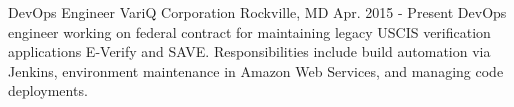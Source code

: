 

\begin{cventries}

  \cventrysix
    {DevOps Engineer} %
    {VariQ Corporation} %
    {Rockville, MD} %
    {Apr. 2015 - Present} %
    {DevOps engineer working on federal contract for maintaining legacy USCIS verification applications E-Verify and SAVE. Responsibilities include build automation via Jenkins, environment maintenance in Amazon Web Services, and managing code deployments.} %
    {
      \begin{cvitems} %

\end{cvitems}}
\end{cventries}
